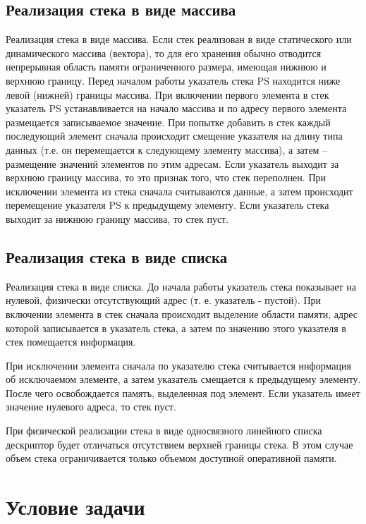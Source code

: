 \subsection{Реализация стека в виде массива}

Реализация стека в виде массива. Если стек реализован в виде статического или 
динамического массива (вектора), то для его хранения обычно отводится непрерывная 
область памяти ограниченного размера, имеющая нижнюю и верхнюю границу. Перед 
началом работы указатель стека PS находится ниже левой (нижней) границы массива. При 
включении первого элемента в стек указатель PS устанавливается на начало массива и по 
адресу первого элемента размещается записываемое значение. При попытке добавить в 
стек каждый последующий элемент сначала происходит смещение указателя на длину 
типа  данных  (т.е.  он  перемещается  к  следующему  элементу  массива),  а  затем  – 
размещение значений элементов по этим адресам. Если указатель выходит за верхнюю 
границу массива, то это признак того, что стек переполнен. При исключении элемента из 
стека сначала считываются данные, а затем  происходит перемещение указателя PS  к 
предыдущему элементу. Если указатель стека выходит за нижнюю границу массива, то 
стек пуст.

\subsection{Реализация стека в виде списка}

Реализация стека в виде списка. До начала работы указатель стека показывает на 
нулевой, физически отсутствующий адрес (т. е.  указатель  -  пустой). При включении 
элемента  в  стек  сначала  происходит  выделение  области  памяти,  адрес  которой 
записывается в указатель стека, а затем по значению этого указателя в стек помещается 
информация.  

При исключении  элемента сначала по указателю стека считывается информация об 
исключаемом элементе, а затем указатель смещается к предыдущему элементу. После 
чего освобождается память, выделенная под элемент. Если указатель имеет значение 
нулевого адреса, то стек пуст.  

При физической реализации стека в виде односвязного линейного списка дескриптор 
будет  отличаться  отсутствием  верхней  границы  стека.  В  этом  случае  объем  стека 
ограничивается только объемом доступной оперативной памяти.

\section{Условие задачи}

